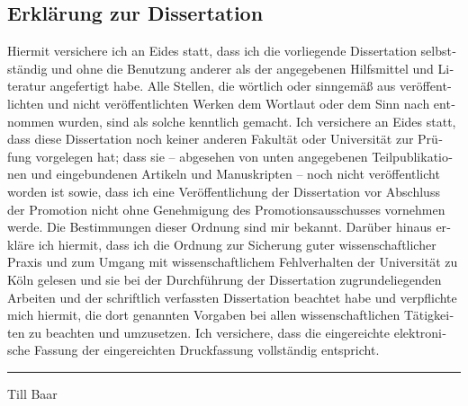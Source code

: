\begin{otherlanguage}{german}

\chapter*{Erkl\"arung zur Dissertation}

Hiermit versichere ich an Eides statt, dass ich die vorliegende Dissertation
selbstständig und ohne die Benutzung anderer als der angegebenen Hilfsmittel
und Literatur angefertigt habe. Alle Stellen, die wörtlich oder sinngemäß aus
veröffentlichten und nicht veröffentlichten Werken dem Wortlaut oder dem Sinn
nach entnommen wurden, sind als solche kenntlich gemacht. Ich versichere an
Eides statt, dass diese Dissertation noch keiner anderen Fakultät oder
Universität zur Prüfung vorgelegen hat; dass sie -- abgesehen von unten
angegebenen Teilpublikationen und eingebundenen Artikeln und Manuskripten --
noch nicht veröffentlicht worden ist sowie, dass ich eine Veröffentlichung der
Dissertation vor Abschluss der Promotion nicht ohne Genehmigung des
Promotionsausschusses vornehmen werde. Die Bestimmungen dieser Ordnung sind mir
bekannt. Darüber hinaus erkläre ich hiermit, dass ich die Ordnung zur
Sicherung guter wissenschaftlicher Praxis und zum Umgang mit wissenschaftlichem
Fehlverhalten der Universität zu Köln gelesen und sie bei der Durchführung der
Dissertation zugrundeliegenden Arbeiten und der schriftlich verfassten
Dissertation beachtet habe und verpflichte mich hiermit, die dort genannten
Vorgaben bei allen wissenschaftlichen Tätigkeiten zu beachten und umzusetzen.
Ich versichere, dass die eingereichte elektronische Fassung der eingereichten
Druckfassung vollständig entspricht.

\vspace{5\baselineskip}
\hrule
\vspace{\dp\strutbox}

Till Baar

\end{otherlanguage}